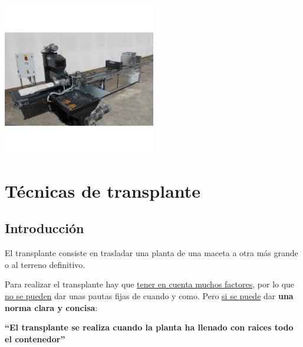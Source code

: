 \documentclass[a4paper,12pt,oneside]{article}
\begin{document}
\begin{center}
\includegraphics[width=0.5\textwidth]{./img_uf1596/sembradora_bandejas.png}
\end{center}
\newpage
\section{Técnicas de transplante}
\label{sec:org50a6c74}
\subsection{Introducción}
\label{sec:orgcd3b955}
El transplante consiste en trasladar una planta de una maceta a otra más grande
o al terreno definitivo.

Para realizar el transplante hay que \uline{tener en cuenta muchos factores}, por lo
que \uline{no se pueden} dar unas pautas fijas de cuando y como. Pero \uline{si se puede}
dar \textbf{una norma clara y concisa}:
\begin{center}
\textbf{ ``El transplante se realiza cuando la planta ha llenado con raices todo el
 contenedor'' } 
\end{center}
\end{document}

